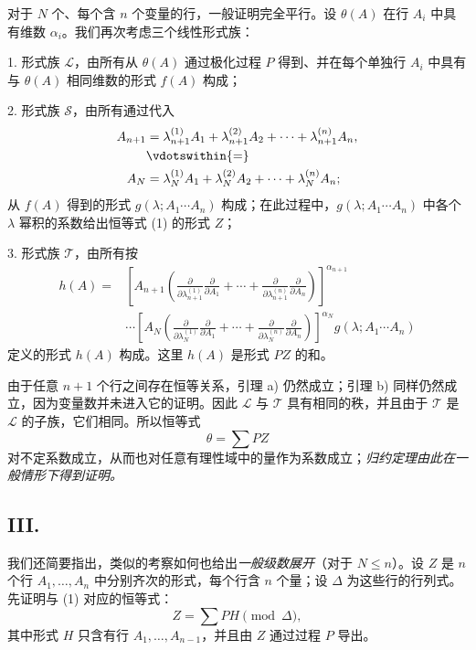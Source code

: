 对于 $N$ 个、每个含 $n$ 个变量的行，一般证明完全平行。设 $\theta(A)$ 在行 $A_i$ 中具有维数 $\alpha_i$。我们再次考虑三个线性形式族：

1. 形式族 $\mathcal L$，由所有从 $\theta(A)$ 通过极化过程 $P$ 得到、并在每个单独行 $A_i$ 中具有与 $\theta(A)$ 相同维数的形式 $f(A)$ 构成；

2. 形式族 $\mathcal S$，由所有通过代入
\[
\begin{aligned}
 A_{n+1}&=\lambda_{n+1}^{(1)}A_1+\lambda_{n+1}^{(2)}A_2+
        \cdots+\lambda_{n+1}^{(n)}A_n,\\
 &\vdotswithin{=}\\
 A_N&=\lambda_N^{(1)}A_1+\lambda_N^{(2)}A_2+
        \cdots+\lambda_N^{(n)}A_n;
\end{aligned}
\]
从 $f(A)$ 得到的形式 $g(\lambda;A_1\cdots A_n)$ 构成；在此过程中，$g(\lambda;A_1\cdots A_n)$ 中各个 $\lambda$ 幂积的系数给出恒等式 (1) 的形式 $Z$；

3. 形式族 $\mathcal T$，由所有按
\[
\begin{aligned}
 h(A)=&\left[A_{n+1}\left(
 \frac{\partial}{\partial\lambda_{n+1}^{(1)}}\frac{\partial}{\partial A_1}
 +\cdots+
 \frac{\partial}{\partial\lambda_{n+1}^{(n)}}\frac{\partial}{\partial A_n}\right)\right]^{\alpha_{n+1}} \\
&\cdots
\left[A_N\left(
 \frac{\partial}{\partial\lambda_N^{(1)}}\frac{\partial}{\partial A_1}
 +\cdots+
 \frac{\partial}{\partial\lambda_N^{(n)}}\frac{\partial}{\partial A_n}\right)\right]^{\alpha_N}
 g(\lambda;A_1\cdots A_n)
\end{aligned}
\]
定义的形式 $h(A)$ 构成。这里 $h(A)$ 是形式 $PZ$ 的和。

由于任意 $n+1$ 个行之间存在恒等关系，引理 a) 仍然成立；引理 b) 同样仍然成立，因为变量数并未进入它的证明。因此 $\mathcal L$ 与 $\mathcal T$ 具有相同的秩，并且由于 $\mathcal T$ 是 $\mathcal L$ 的子族，它们相同。所以恒等式
\[
  \theta=\sum PZ
\]
对不定系数成立，从而也对任意有理性域中的量作为系数成立；\emph{归约定理由此在一般情形下得到证明。}

\subsection*{III.}
我们还简要指出，类似的考察如何也给出\emph{一般级数展开}（对于 $N\le n$）。设 $Z$ 是 $n$ 个行 $A_1,\ldots,A_n$ 中分别齐次的形式，每个行含 $n$ 个量；设 $\Delta$ 为这些行的行列式。先证明与 (1) 对应的恒等式：
\begin{equation}
  Z=\sum PH \pmod{\Delta},
\tag{2}
\end{equation}
其中形式 $H$ 只含有行 $A_1,\ldots,A_{n-1}$，并且由 $Z$ 通过过程 $P$ 导出。

